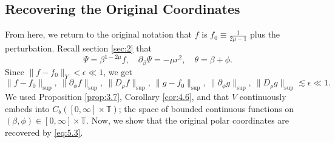 \documentclass[11pt]{article}
\theoremstyle{definition}
\theoremstyle{remark}
\numberwithin{equation}{section}
\newcommand{\mbb}{\mathbb}
\newcommand{\del}{\partial}
\newcommand{\norm}[1]{\lVert #1 \rVert}
\begin{document}
\subsection{Recovering the Original Coordinates} \label{subsec:5.2}
From here, we return to the original notation that $f$ is $f_0 \equiv \frac{1}{2\mu - 1}$ plus the perturbation. Recall section \ref{sec:2} that
\begin{equation} \label{eq:5.3}
\Psi = \beta^{1-2\mu} f, \quad \del_\beta \Psi = - \mu r^2, \quad \theta = \beta + \phi.
\end{equation}
Since $\norm{f - f_0}_Y < \epsilon \ll 1$, we get
\[\norm{f - f_0}_{\sup}, ~ \norm{\del_\phi f}_{\sup}, ~ \norm{D_\rho f}_{\sup}, ~ \norm{g - f_0}_{\sup}, ~ \norm{\del_\phi g}_{\sup}, ~ \norm{D_\rho g}_{\sup} \lesssim \epsilon \ll 1.\]
We used Proposition \ref{prop:3.7}, Corollary \ref{cor:4.6}, and that $V$ continuously embeds into $C_b([0,\infty] \times \mbb{T})$; the space of bounded continuous functions on $(\beta,\phi) \in [0,\infty] \times \mbb{T}$. Now, we show that the original polar coordinates are recovered by \eqref{eq:5.3}.
\end{document}
